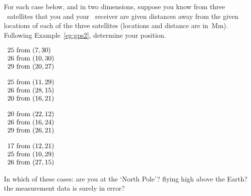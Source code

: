 \begin{exercise} \label{ex:gps2} 
For each case below, and in two dimensions, suppose you know from three \gps\ satellites that you and your \gps\ receiver are given distances away from the given locations of each of the three satellites (locations and distance are in~Mm).  
Following Example~\ref{eg:gps2}, determine your position.  
\begin{parts}
\item \(\begin{array}{r@{\text{ from }}l}
25&(7,30)\\26&(10,30)\\29&(20,27)
\end{array}\)

\item \(\begin{array}{r@{\text{ from }}l}
25&(11,29)\\26&(28,15)\\20&(16,21)
\end{array}\)

\item \(\begin{array}{r@{\text{ from }}l}
20&(22,12)\\26&(16,24)\\29&(26,21)
\end{array}\)

\item \(\begin{array}{r@{\text{ from }}l}
17&(12,21)\\25&(10,29)\\26&(27,15)
\end{array}\)

\end{parts}
In which of these cases: are you at the `North Pole'?  flying high above the Earth?  the measurement data is surely in error?
\end{exercise}



\begin{comment}%
why, what caused X?
how did X occur?
what-if? what-if-not?
how does X compare with Y?
what is the evidence for X?
why is X important?
\end{comment}









